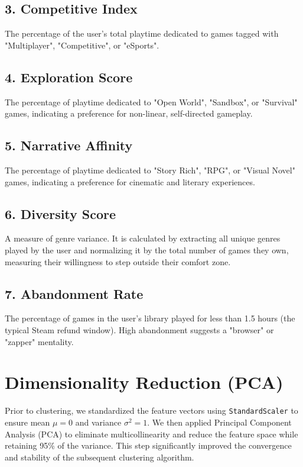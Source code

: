 \documentclass[12pt, a4paper]{report}
\begin{document}
\subsection{3. Competitive Index}
The percentage of the user's total playtime dedicated to games tagged with "Multiplayer", "Competitive", or "eSports".

\subsection{4. Exploration Score}
The percentage of playtime dedicated to "Open World", "Sandbox", or "Survival" games, indicating a preference for non-linear, self-directed gameplay.

\subsection{5. Narrative Affinity}
The percentage of playtime dedicated to "Story Rich", "RPG", or "Visual Novel" games, indicating a preference for cinematic and literary experiences.

\subsection{6. Diversity Score}
A measure of genre variance. It is calculated by extracting all unique genres played by the user and normalizing it by the total number of games they own, measuring their willingness to step outside their comfort zone.

\subsection{7. Abandonment Rate}
The percentage of games in the user's library played for less than 1.5 hours (the typical Steam refund window). High abandonment suggests a "browser" or "zapper" mentality.

\section{Dimensionality Reduction (PCA)}
Prior to clustering, we standardized the feature vectors using \texttt{StandardScaler} to ensure mean $\mu = 0$ and variance $\sigma^2 = 1$. We then applied Principal Component Analysis (PCA) to eliminate multicollinearity and reduce the feature space while retaining 95\% of the variance. This step significantly improved the convergence and stability of the subsequent clustering algorithm.
\end{document}
